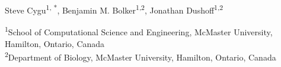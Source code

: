 \begin{flushleft}
{\Large
\textbf{}
}

\bigskip

Steve Cygu\textsuperscript{1, *},
Benjamin M. Bolker\textsuperscript{1,2},
Jonathan Dushoff\textsuperscript{1,2}

\bigskip

\textsuperscript{1}School of Computational Science and Engineering, McMaster University, Hamilton, Ontario, Canada
\\
\textsuperscript{2}Department of Biology, McMaster University, Hamilton, Ontario, Canada
\\
\bigskip

\end{flushleft}
